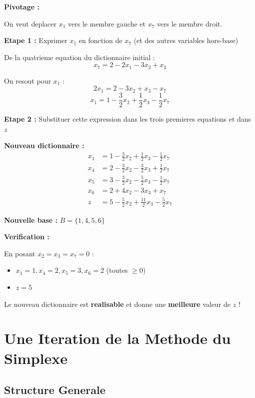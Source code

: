 \documentclass[12pt,a4paper]{article}
\begin{document}
\begin{methode}
\textbf{Pivotage :}

On veut deplacer $x_1$ vers le membre gauche et $x_7$ vers le membre droit.

\textbf{Etape 1 :} Exprimer $x_1$ en fonction de $x_7$ (et des autres variables hors-base)

De la quatrieme equation du dictionnaire initial :
$$x_7 = 2 - 2x_1 - 3x_2 + x_3$$

On resout pour $x_1$ :
$$2x_1 = 2 - 3x_2 + x_3 - x_7$$
$$x_1 = 1 - \frac{3}{2}x_2 + \frac{1}{2}x_3 - \frac{1}{2}x_7$$

\textbf{Etape 2 :} Substituer cette expression dans les trois premieres equations et dans $z$

\textbf{Nouveau dictionnaire :}
\begin{align*}
x_1 &= 1 - \frac{3}{2}x_2 + \frac{1}{2}x_3 - \frac{1}{2}x_7\\
x_4 &= 2 - \frac{3}{2}x_2 - \frac{3}{2}x_3 + \frac{1}{2}x_7\\
x_5 &= 3 - \frac{3}{2}x_2 - \frac{5}{2}x_3 - \frac{1}{2}x_7\\
x_6 &= 2 + 4x_2 - 3x_3 + x_7\\
z &= 5 - \frac{5}{2}x_2 + \frac{11}{2}x_3 - \frac{5}{2}x_7
\end{align*}

\textbf{Nouvelle base :} $B = \{1, 4, 5, 6\}$
\end{methode}

\begin{astuce}
\textbf{Verification :}

En posant $x_2 = x_3 = x_7 = 0$ :
\begin{itemize}
    \item $x_1 = 1, x_4 = 2, x_5 = 3, x_6 = 2$ (toutes $\geq 0$) \checkmark
    \item $z = 5$ \checkmark
\end{itemize}

Le nouveau dictionnaire est \textcolor{defvert}{\textbf{realisable}} et donne une \textcolor{titrebleu}{\textbf{meilleure}} valeur de $z$ !
\end{astuce}

\newpage
\section{Une Iteration de la Methode du Simplexe}

\subsection{Structure Generale}
\end{document}
